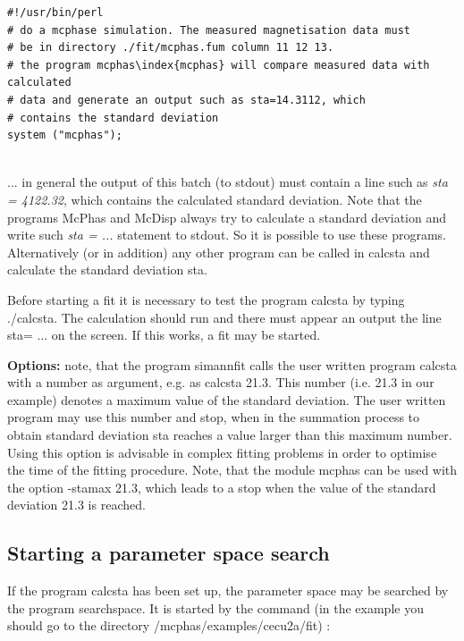 \begin{verbatim}
#!/usr/bin/perl
# do a mcphase simulation. The measured magnetisation data must
# be in directory ./fit/mcphas.fum column 11 12 13.
# the program mcphas\index{mcphas} will compare measured data with calculated
# data and generate an output such as sta=14.3112, which
# contains the standard deviation
system ("mcphas");


\end{verbatim}

... in general the output of this batch (to stdout) must contain a line
such as {\em sta = 4122.32}, which contains the calculated standard
deviation. Note that the programs {\prg McPhas} and {\prg McDisp} always try to
calculate a standard deviation and write such {\em sta = ...} statement
to stdout.
 So it is possible to use these programs. Alternatively (or in addition)
any other program can be called in {\prg calcsta} and calculate the 
standard deviation {\prg sta}.

Before starting a fit it is necessary to test the program {\prg calcsta} by typing
{\prg ./calcsta}. The calculation should run and there must appear an output
the line {\prg sta= ...} on the screen. If this works, a fit may be started.

{\bf Options:} note, that the program {\prg simannfit} calls the user written program
{\prg calcsta} with a number as argument, e.g. as {\prg calcsta 21.3}. This number
(i.e. 21.3 in our example) denotes a maximum value of the standard deviation. The
user written program may use this number and stop, when in the summation process
to obtain standard deviation {\prg sta} reaches a value larger than this maximum
number. Using this option is advisable in complex fitting problems in order to
optimise the time of the fitting procedure. Note, that the module {\prg mcphas}
can be used with the option {\prg -stamax 21.3}, which leads to a stop when the value of 
the standard deviation 21.3 is reached. 

\subsection{Starting a parameter space search}

If the program {\prg calcsta} has been set up, the parameter space may be
searched by the program {\prg searchspace}. It is started
by the command (in the example you should go to the directory {\prg /mcphas/examples/cecu2a/fit}) 
:

